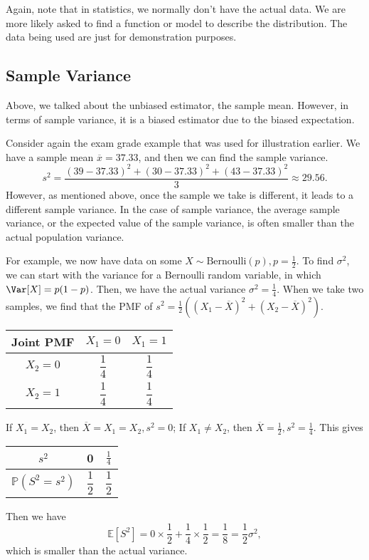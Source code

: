 \begin{remark}
  Again, note that in statistics, we normally don't have the actual data. We are more likely asked to find a function or model to describe the distribution. The data being used are just for demonstration purposes.
\end{remark}

\subsection{Sample Variance}
Above, we talked about the unbiased estimator, the sample mean. However, in terms of sample variance, it is a biased estimator due to the biased expectation.

Consider again the exam grade example that was used for illustration earlier. We have a sample mean \(\overline{x} = 37.33\), and then we can find the sample variance.
\[
  s^2 = \dfrac{(39 - 37.33)^2 + (30 - 37.33)^2 + (43 - 37.33)^2}{3} \approx 29.56. 
\]
However, as mentioned above, once the sample we take is different, it leads to a different sample variance. In the case of sample variance, the average sample variance, or the expected value of the sample variance, is often smaller than the actual population variance.

For example, we now have data on some \(X \sim \text{Bernoulli}(p), p = \frac{1}{2}\). To find \(\sigma^2\), we can start with the variance for a Bernoulli random variable, in which \(\Var[X] = p(1 - p)\). Then, we have the actual variance \(\sigma^2 = \frac{1}{4}\). When we take two samples, we find that the PMF of \(s^2 = \frac{1}{2}((X_1 - \overline{X})^2 + (X_2 - \overline{X})^2)\).

\begin{table}[H]
  \centering
  \begin{tabular}{c|c|c}
      \toprule
      Joint PMF & \(X_1 = 0\) & \(X_1 = 1\)  \\
    \midrule
      \(X_2 = 0\) & \(\dfrac{1}{4}\) & \(\dfrac{1}{4}\)  \\[8pt]
      \(X_2 = 1\) & \(\dfrac{1}{4}\) & \(\dfrac{1}{4}\)  \\
      \bottomrule
  \end{tabular}
\end{table}
If \(X_1 = X_2\), then \(\overline{X} = X_1 = X_2, s^2 = 0\); If \(X_1 \neq X_2\), then \(\overline{X} = \frac{1}{2}, s^2 = \frac{1}{4}\). This gives
\begin{table}[H]
  \centering
  \begin{tabular}{c|c|c}
      \toprule
      \(s^2\) & 0 & \(\frac{1}{4}\) \\
    \midrule
      \(\mathbb{P}(S^2 = s^2)\) & \(\dfrac{1}{2}\) & \(\dfrac{1}{2}\) \\
      \bottomrule
  \end{tabular}
\end{table}
Then we have 
\[
  \mathbb{E}[S^2] = 0 \times \frac{1}{2} + \dfrac{1}{4} \times \dfrac{1}{2} = \dfrac{1}{8} = \dfrac{1}{2}\sigma^2,
\]
which is smaller than the actual variance. 

